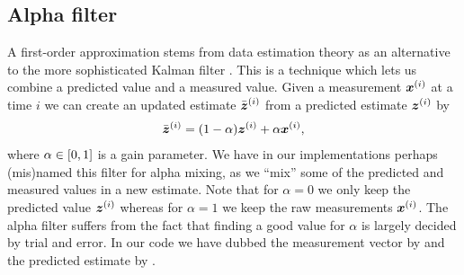         \subsection{Alpha filter}
            \label{subsec:alpha-filter}
            A first-order approximation stems from data estimation theory as an
            alternative to the more sophisticated Kalman filter
            \cite{brookner1998tracking}.
            This is a technique which lets us combine a predicted value and a
            measured value.
            Given a measurement $\boldsymbol{x}^{(i)}$ at a time $i$ we can create an
            updated estimate $\bar{\boldsymbol{z}}^{(i)}$ from a predicted estimate
            $\boldsymbol{z}^{(i)}$ by
            \begin{align}
                \bar{\boldsymbol{z}}^{(i)} = (1 - \alpha) \boldsymbol{z}^{(i)}
                + \alpha \boldsymbol{x}^{(i)},
            \end{align}
            where $\alpha \in \left[ 0, 1 \right]$ is a gain parameter.
            We have in our implementations perhaps (mis)named this filter for
            alpha mixing, as we ``mix'' some of the predicted and measured
            values in a new estimate.
            Note that for $\alpha = 0$ we only keep the predicted value
            $\boldsymbol{z}^{(i)}$ whereas for $\alpha = 1$ we keep the raw
            measurements $\boldsymbol{x}^{(i)}$.
            The alpha filter suffers from the fact that finding a good value for
            $\alpha$ is largely decided by trial and error.
            In our code we have dubbed the measurement vector by
             and the predicted estimate by
            .

